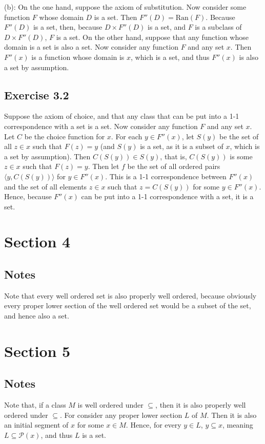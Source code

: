 \documentclass{article}
\theoremstyle{definition}
\begin{document}
(b): On the one hand, suppose the axiom of substitution. Now consider some function $F$ whose domain $D$ is a set. Then $F''(D)=\textrm{Ran}(F)$. Because 
$F''(D)$ is a set, then, because $D\times F''(D)$ is a set, and $F$ is a subclass of $D\times F''(D)$, $F$ is a set. On the other hand, suppose that 
any function whose domain is a set is also a set. Now consider any function $F$ and any set $x$. Then $F''(x)$ is a function whose domain is $x$, which is a set, 
and thus $F''(x)$ is also a set by assumption.

\subsection*{Exercise 3.2}
Suppose the axiom of choice, and that any class that can be put into a 1-1 correspondence with a set is a set. Now consider any function $F$ and 
any set $x$. Let $C$ be the choice function for $x$. For each $y\in F''(x)$, let $S(y)$ be the set of all $z\in x$ such that $F(z)=y$ (and $S(y)$ is a set, as it is a subset of $x$, which 
is a set by assumption). Then $C(S(y))\in S(y)$, that is, $C(S(y))$ is some $z\in x$ such that $F(z)=y$. Then let $f$ be the set of all ordered pairs 
$\langle y,C(S(y))\rangle$ for $y\in F''(x)$. This is a 1-1 correspondence between $F''(x)$ and the set of all elements $z\in x$ such that $z=C(S(y))$ for some $y\in F''(x)$. Hence, 
because $F''(x)$ can be put into a 1-1 correspondence with a set, it is a set.

\section*{Section 4}

\subsection*{Notes}
Note that every well ordered set is also properly well ordered, because obviously every proper lower section of the well ordered set would be a subset of the 
set, and hence also a set.

\section*{Section 5}

\subsection*{Notes}
Note that, if a class $M$ is well ordered under $\subseteq$, then it is also properly well ordered under $\subseteq$. For consider any proper lower section $L$ of 
$M$. Then it is also an initial segment of $x$ for some $x\in M$. Hence, for every $y\in L$, $y\subseteq x$, meaning $L\subseteq\mathcal{P}(x)$, and thus 
$L$ is a set.
\end{document}
